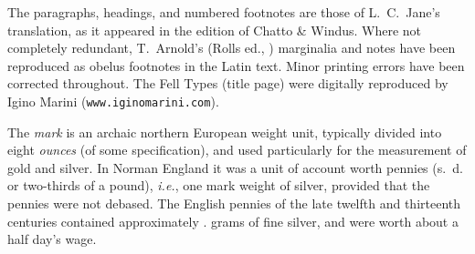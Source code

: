 \documentclass[10pt]{book}
\begin{document}
{\begin{center}
\hspace{0cm}\vspace{1.0cm}

\parbox{8cm}{

\begin{center}
\end{center}

\vspace{.25cm}
{
The paragraphs, headings, and numbered footnotes are those of L.\ C.\ Jane's translation, as it appeared in the  edition of Chatto \& Windus. Where not completely redundant, T.\ Arnold's (Rolls ed., ) marginalia and notes have been reproduced as obelus footnotes in the Latin text. Minor printing errors have been corrected throughout. The Fell Types (title page) were digitally reproduced by Igino Marini (\texttt{www.iginomarini.com}).
}
}

\end{center}


\begin{center}

\hspace{0cm}\vspace{1.0cm}

\parbox{8cm}{

\begin{center}
\end{center}

\vspace{.25cm}
{
The \emph{mark} is an archaic northern European weight unit, typically divided into eight \emph{ounces} (of some specification), and used particularly for the measurement of gold and silver. In Norman England it was a unit of account worth  pennies (s.\ d. or two-thirds of a pound), \emph{i.e.}, one mark weight of silver, provided that the pennies were not debased. The English pennies of the late twelfth and thirteenth centuries contained approximately .\hspace{1pt} grams of fine silver, and were worth about a half day's wage.
}
}

\end{center}





\cleardoublepage


}
\end{document}
